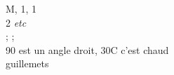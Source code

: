 M, 1\ier, 1\iere\\

2\ieme{} \emph{etc}\\
; ;
\\
90\degres{} est un angle
droit, 30\degres C c'est
chaud\\

\og guillemets\fg
